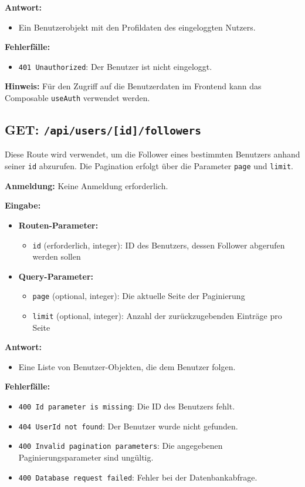 \documentclass[a4paper,12pt]{article}
\begin{document}
\textbf{Antwort:}
\begin{itemize}
    \item Ein Benutzerobjekt mit den Profildaten des eingeloggten Nutzers.
\end{itemize}

\textbf{Fehlerfälle:}
\begin{itemize}
    \item \texttt{401 Unauthorized}: Der Benutzer ist nicht eingeloggt.
\end{itemize}

\textbf{Hinweis:}
Für den Zugriff auf die Benutzerdaten im Frontend kann das Composable
\texttt{useAuth} verwendet werden.

\newpage
\subsection{GET: \texttt{/api/users/[id]/followers}}

Diese Route wird verwendet, um die Follower eines bestimmten Benutzers anhand
seiner \texttt{id} abzurufen. Die Pagination erfolgt über die Parameter
\texttt{page} und \texttt{limit}.

\textbf{Anmeldung:} Keine Anmeldung erforderlich.

\textbf{Eingabe:}
\begin{itemize}
    \item \textbf{Routen-Parameter:}
    \begin{itemize}
        \item \texttt{id} (erforderlich, integer):
            ID des Benutzers, dessen Follower abgerufen werden sollen
    \end{itemize}
    \item \textbf{Query-Parameter:}
    \begin{itemize}
        \item \texttt{page} (optional, integer):
            Die aktuelle Seite der Paginierung
        \item \texttt{limit} (optional, integer):
            Anzahl der zurückzugebenden Einträge pro Seite
    \end{itemize}
\end{itemize}

\textbf{Antwort:}
\begin{itemize}
    \item Eine Liste von Benutzer-Objekten, die dem Benutzer folgen.
\end{itemize}

\textbf{Fehlerfälle:}
\begin{itemize}
    \item \texttt{400 Id parameter is missing}:
        Die ID des Benutzers fehlt.
    \item \texttt{404 UserId not found}:
        Der Benutzer wurde nicht gefunden.
    \item \texttt{400 Invalid pagination parameters}:
        Die angegebenen Paginierungsparameter sind ungültig.
    \item \texttt{400 Database request failed}:
       Fehler bei der Datenbankabfrage.
\end{itemize}
\end{document}
